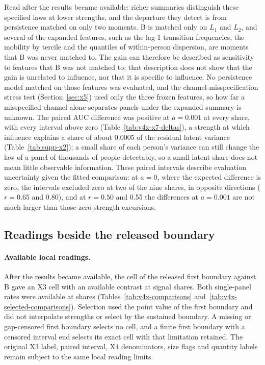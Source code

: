 Read after the results became available: richer summaries distinguish these specified laws at lower strengths, and the departure they detect is from persistence matched on only two moments. B is matched only on $L_1$ and $L_2$, and several of the expanded features, such as the lag-1 transition frequencies, the mobility by tercile and the quantiles of within-person dispersion, are moments that B was never matched to. The gain can therefore be described as sensitivity to features that B was not matched to; that description does not show that the gain is unrelated to influence, nor that it is specific to influence. No persistence model matched on those features was evaluated, and the channel-misspecification stress test (Section~\ref{sec:x5}) used only the three frozen features, so how far a misspecified channel alone separates panels under the expanded summary is unknown. The paired AUC difference was positive at $a=0.001$ at every share, with every interval above zero (Table~\ref{tab:v4x-x7-deltas}), a strength at which influence explains a share of about 0.0005 of the residual latent variance (Table~\ref{tab:supp-x2}); a small share of each person's variance can still change the law of a panel of thousands of people detectably, so a small latent share does not mean little observable information. These paired intervals describe evaluation uncertainty given the fitted comparison: at $a=0$, where the expected difference is zero, the intervals excluded zero at two of the nine shares, in opposite directions ($r=0.65$ and 0.80), and at $r=0.50$ and 0.55 the differences at $a=0.001$ are not much larger than those zero-strength excursions.




\clearpage

\subsection{Readings beside the released boundary}\label{sec:x-readings}\label{supp:x1b-release}

\paragraph{Available local readings.}
After the results became available, the cell of the released first boundary against B gave an X3 cell with an available contrast at  signal shares. Both single-panel rates were available at  shares (Tables~\ref{tab:v4x-comparisons} and~\ref{tab:v4x-selected-comparisons}). Selection used the point value of the first boundary and did not interpolate strengths or select by the sustained boundary. A missing or gap-censored first boundary selects no cell, and a finite first boundary with a censored interval end selects its exact cell with that limitation retained. The original X3 label, paired interval, X4 denominators, size flags and quantity labels remain subject to the same local reading limits.

